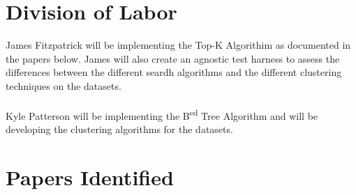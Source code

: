 \documentclass[pdftex,12pt,letter]{article}
\begin{document}
\section{Division of Labor}
James Fitzpatrick will be implementing the Top-K  Algorithim as documented in the papers below. James will also create an agnostic test harness to assess the differences between the different seardh algorithms and the different clustering techniques on the datasets. 
\\\\
Kyle Patterson will be implementing the B\textsuperscript{ed} Tree Algorithm and will be developing the clustering algorithms for the datasets. 

\section{Papers Identified}

\FloatBarrier
\end{document}
